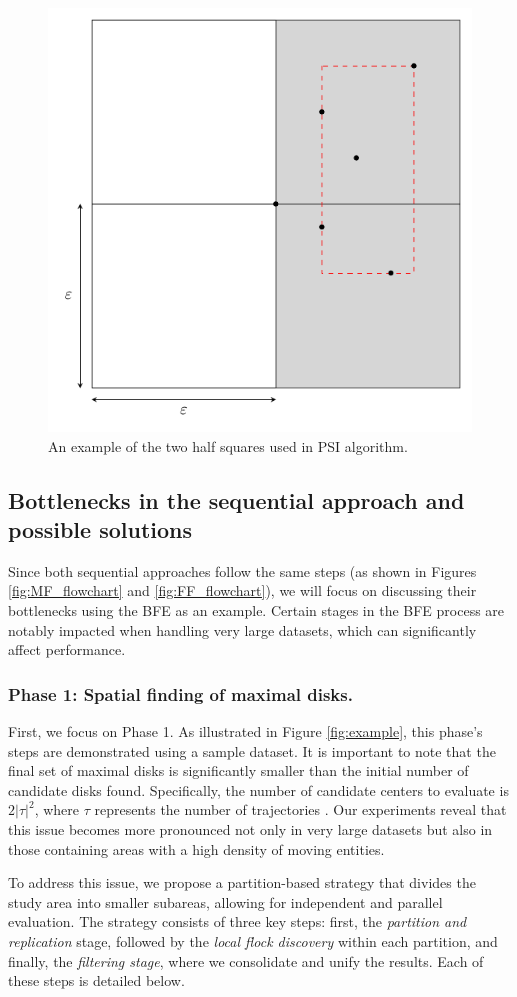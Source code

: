 \begin{figure}
    \centering
    \includegraphics[width=0.5\linewidth]{figures/square.pdf}
    \caption{An example of the two half squares used in PSI algorithm.}\label{fig:square}
\end{figure}

\subsection{Bottlenecks in the sequential approach and possible solutions} \label{spatial_phase}
Since both sequential approaches follow the same steps (as shown in Figures \ref{fig:MF_flowchart} and \ref{fig:FF_flowchart}), we will focus on discussing their bottlenecks using the BFE as an example. Certain stages in the BFE process are notably impacted when handling very large datasets, which can significantly affect performance.

\subsubsection{Phase 1: Spatial finding of maximal disks.}
First, we focus on Phase 1. As illustrated in Figure \ref{fig:example}, this phase's steps are demonstrated using a sample dataset. It is important to note that the final set of maximal disks is significantly smaller than the initial number of candidate disks found. Specifically, the number of candidate centers to evaluate is $2\lvert\tau\rvert^2$, where $\tau$ represents the number of trajectories \cite{vieira_2009}. Our experiments reveal that this issue becomes more pronounced not only in very large datasets but also in those containing areas with a high density of moving entities.

To address this issue, we propose a partition-based strategy that divides the study area into smaller subareas, allowing for independent and parallel evaluation. The strategy consists of three key steps: first, the \textit{partition and replication} stage, followed by the \textit{local flock discovery} within each partition, and finally, the \textit{filtering stage}, where we consolidate and unify the results. Each of these steps is detailed below.

